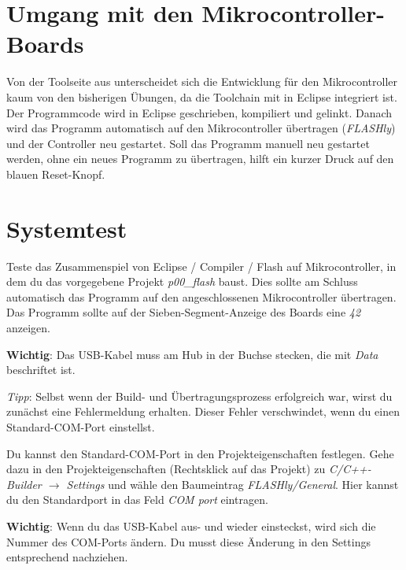 


\newcommand{\tag}{5}

\cppSetTitle


	
\cppSetHeaderAndMakeTitle 


\section{Umgang mit den Mikrocontroller-Boards}

Von der Toolseite aus unterscheidet sich die Entwicklung für den Mikrocontroller kaum von den bisherigen Übungen, da die Toolchain mit in Eclipse integriert ist.
Der Programmcode wird in Eclipse geschrieben, kompiliert und gelinkt.
Danach wird das Programm automatisch auf den Mikrocontroller übertragen (\emph{FLASHly}) und der Controller neu gestartet.
Soll das Programm manuell neu gestartet werden, ohne ein neues Programm zu übertragen, hilft ein kurzer Druck auf den blauen Reset-Knopf.


\section{Systemtest}

Teste das Zusammenspiel von Eclipse / Compiler / Flash auf Mikrocontroller, in dem du das vorgegebene Projekt \emph{p00\_flash} baust.
Dies sollte am Schluss automatisch das Programm auf den angeschlossenen Mikrocontroller übertragen.
Das Programm sollte auf der Sieben-Segment-Anzeige des Boards eine \textit{42} anzeigen.

\textbf{Wichtig}: Das USB-Kabel muss am Hub in der Buchse stecken, die mit \emph{Data} beschriftet ist.

\emph{Tipp}:
Selbst wenn der Build- und Übertragungsprozess erfolgreich war, wirst du zunächst eine Fehlermeldung erhalten.
Dieser Fehler verschwindet, wenn du einen Standard-COM-Port einstellst.

Du kannst den Standard-COM-Port in den Projekteigenschaften festlegen.
Gehe dazu in den Projekteigenschaften (Rechtsklick auf das Projekt) zu \emph{C/C++-Builder $\to$ Settings} und wähle den Baumeintrag \emph{FLASHly/General}.
Hier kannst du den Standardport in das Feld \emph{COM port} eintragen.

\textbf{Wichtig}: Wenn du das USB-Kabel aus- und wieder einsteckst, wird sich die Nummer des COM-Ports ändern.
Du musst diese Änderung in den Settings entsprechend nachziehen.

